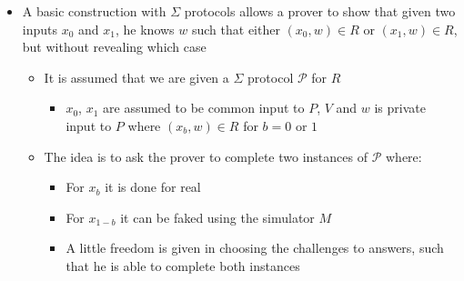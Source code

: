 \begin{itemize}
  \item A basic construction with $\Sigma$ protocols allows a prover to show that given two inputs $x_0$ and $x_1$, he knows $w$ such that either $(x_0,w) \in R$ or $(x_1,w) \in R$, but without revealing which case
  \begin{itemize}
  	\item It is assumed that we are given a $\Sigma$ protocol $\mathcal P$ for $R$
    \begin{itemize}
      \item $x_0$, $x_1$ are assumed to be common input to $P$, $V$ and $w$ is private input to $P$ where $(x_b,w) \in R$ for $b=0$ or $1$
    \end{itemize}
  	\item The idea is to ask the prover to complete two instances of $\mathcal P$ where:
    \begin{itemize}
  		\item For $x_b$ it is done for real
  		\item For $x_{1-b}$ it can be faked using the simulator $M$
  		\item A little freedom is given in choosing the challenges to answers, such that he is able to complete both instances
    \end{itemize}
  \end{itemize}


\end{itemize}
